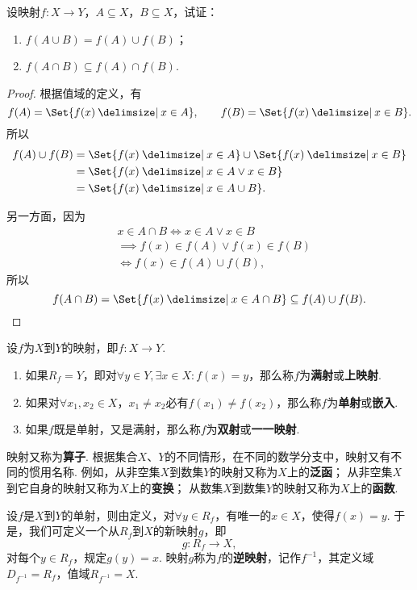 \begin{example}
设映射\(f\colon X \to Y\)，\(A \subseteq X\)，\(B \subseteq X\)，试证：\begin{enumerate}
\item \(f(A \cup B) = f(A) \cup f(B)\)；
\item \(f(A \cap B) \subseteq f(A) \cap f(B)\).
\end{enumerate}
\begin{proof}
\def\fran#1{ \Set{ f(x) \given #1 } }
根据值域的定义，有\[
f(A) = \fran{x \in A},
\qquad
f(B) = \fran{x \in B}.
\]所以\[
\begin{split}
f(A) \cup f(B)
&= \fran{x \in A} \cup \fran{x \in B} \\
&= \fran{x \in A \lor x \in B} \\
&= \fran{x \in A \cup B}.
\end{split}
\]

另一方面，因为\[
\begin{split}
&x \in A \cap B
\iff
x \in A \lor x \in B \\
&\implies
f(x) \in f(A) \lor f(x) \in f(B) \\
&\iff
f(x) \in f(A) \cup f(B),
\end{split}
\]所以\[
f(A \cap B) = \fran{x \in A \cap B}
\subseteq f(A) \cup f(B).
\qedhere
\]
\end{proof}
\end{example}

\begin{definition}
设\(f\)为\(X\)到\(Y\)的映射，即\(f\colon X \to Y\).
\begin{enumerate}
\item 如果\(R_f = Y\)，即对\(\forall y \in Y, \exists x \in X: f(x) = y\)，那么称\(f\)为\textbf{满射}或\textbf{上映射}.
\item 如果对\(\forall x_1, x_2 \in X\)，\(x_1 \neq x_2\)必有\(f(x_1) \neq f(x_2)\)，那么称\(f\)为\textbf{单射}或\textbf{嵌入}.
\item 如果\(f\)既是单射，又是满射，那么称\(f\)为\textbf{双射}或\textbf{一一映射}.
\end{enumerate}

映射又称为\textbf{算子}.
根据集合\(X\)、\(Y\)的不同情形，在不同的数学分支中，映射又有不同的惯用名称.
例如，从非空集\(X\)到数集\(Y\)的映射又称为\(X\)上的\textbf{泛函}；
从非空集\(X\)到它自身的映射又称为\(X\)上的\textbf{变换}；
从数集\(X\)到数集\(Y\)的映射又称为\(X\)上的\textbf{函数}.
\end{definition}

\begin{definition}
设\(f\)是\(X\)到\(Y\)的单射，则由定义，对\(\forall y \in R_f\)，有唯一的\(x \in X\)，使得\(f(x) = y\).
于是，我们可定义一个从\(R_f\)到\(X\)的新映射\(g\)，即\[
g: R_f \to X,
\]对每个\(y \in R_f\)，规定\(g(y) = x\).
映射\(g\)称为\(f\)的\textbf{逆映射}，记作\(f^{-1}\)，其定义域\(D_{f^{-1}} = R_f\)，值域\(R_{f^{-1}} = X\).
\end{definition}

